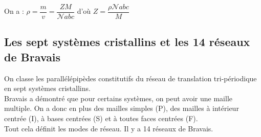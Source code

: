 \documentclass[13pt, twoside, a4paper, french, tikz]{report}
\begin{document}
      On a : $\rho = \dfrac{m}{v} = \dfrac{Z M}{\mathcal{N} abc}$ d'où $Z = \dfrac{\rho \mathcal{N} abc}{M}$
    
    \subsection{Les sept systèmes cristallins et les 14 réseaux de Bravais}\label{subsec:les-sept-systemes-cristallins-et-les-14-reseaux-de-bravais}
      
      On classe les parallélépipèdes constitutifs du réseau de translation tri-périodique en sept systèmes cristallins.\\
      
      Bravais a démontré que pour certains systèmes, on peut avoir une maille multiple.
      On a donc en plus des mailles simples (P), des mailles à intérieur centrée (I), à bases centrées (S) et à toutes faces centrées (F).\\
      Tout cela définit les modes de réseau.
      Il y a 14 réseaux de Bravais.\\
      
\end{document}
